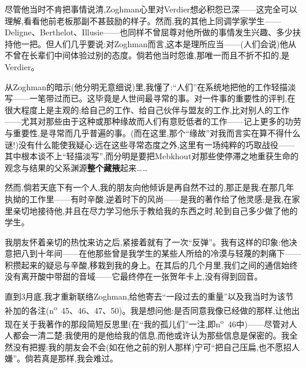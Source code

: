 尽管他当时不肯把事情说清,Zoghman心里对Verdier想必积怨已深——这完全可以理解,看看他前老板那副不甚鼓励的样子。然而,我的其他上同调学家学生——Deligne、Berthelot、Illusie——也同样不曾屈尊对他所做的事情发生兴趣、多少扶持他一把。但人们几乎要说:对Zoghman而言,这本是理所应当——(人们会说)他从不曾在长辈们中间体验过别的态度。倘若他当时怨谁,那唯一而且不折不扣的,是Verdier。

从Zoghman的暗示(他分明无意细说)里,我懂了:“人们”在系统地把他的工作轻描淡写——一笔带过而已。这毕竟是人世间最寻常的事。对一件事的重要性的评判,在很大程度上是主观的;给自己的工作、给自己伙伴与盟友的工作,比对别人的工作——尤其对那些由于这种或那种缘故而人们有意贬低者的工作——记上更多的功劳与重要性,是寻常而几乎普遍的事。(而在这里,那个“缘故”对我而言实在算不得什么谜!)没有什么能使我疑心:远在这些寻常态度之外,这里有一场纯粹的巧取战役——其中根本谈不上“轻描淡写”,而分明是要把Mebkhout对那些使停滞之地重获生命的观念与结果的父系渊源\textbf{整个藏掖}起来……

然而,倘若天底下有一个人,我的朋友向他倾诉是再自然不过的,那正是我:在那几年执拗的工作里——有时辛酸,逆着时下的风尚——是我的著作给了他灵感;是我,在家里亲切地接待他,并且在尽力学习他乐于教给我的东西之时,轮到自己多少\dmark{}做了他的学生。

我朋友怀着亲切的热忱来访之后,紧接着就有了一次“反弹”。我有这样的印象:他决意把八到十年间——在他那些曾是我学生的某些人所给的冷漠与轻蔑的刺痛下——积攒起来的疑忌与辛酸,移栽到我的身上。在其后的几个月里,我们之间的通信始终没有离开酸中带甜的音域——它最终停在一张贺年卡上,没有得到回音。

直到3月底,我才重新联络Zoghman,给他寄去“一段过去的重量”以及我当时为该节补加的各注(n\textsuperscript{o}~45、46、47、50)。我是想问他:是否同意我像已经做的那样,让他出现在关于我著作的那段简短反思里(在“我的孤儿们”一注,即n\textsuperscript{o}~46中)——尽管对人人都会一清二楚:我使用的是他给我的信息,而他或许认为那些信息是保密的。我全然没有把握:我的朋友会不会(如在他之前的别人那样)宁可“把自己压扁,也不愿招人嫌”。倘若真是那样,我会难过。

